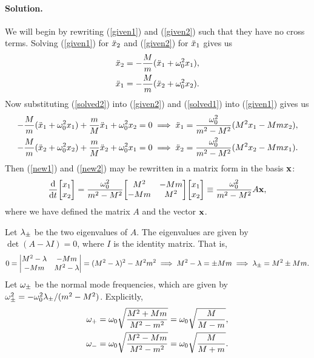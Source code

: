 \documentclass[11pt]{article}
\newcommand{\refeq}[1]{(\ref{#1})}
\newenvironment{solution}
{
    \paragraph{Solution.}
    \ignorespaces
}
{
    \bigskip
}
\begin{document}
\begin{solution}
	We will begin by rewriting \refeq{given1} and \refeq{given2} such that they have no cross terms.  Solving \refeq{given1} for $\ddot{x}_2$ and \refeq{given2} for $\ddot{x}_1$ gives us
	\begin{align}
		\ddot{x}_2 &= -\frac{M}{m} (\ddot{x}_1 + \omega_0^2 x_1), \label{solved2} \\
		\ddot{x}_1 &= -\frac{M}{m} (\ddot{x}_2 + \omega_0^2 x_2). \label{solved1}
	\end{align}
	Now substituting \refeq{solved2} into \refeq{given2} and \refeq{solved1} into \refeq{given1} gives us
	\begin{align}
		-\frac{M}{m} (\ddot{x}_1 + \omega_0^2 x_1) + \frac{m}{M} \ddot{x}_1 + \omega_0^2 x_2 = 0 &\implies \ddot{x}_1 = \frac{\omega_0^2}{m^2 - M^2} (M^2 x_1 - M m x_2), \label{new1} \\
		-\frac{M}{m} (\ddot{x}_2 + \omega_0^2 x_2) + \frac{m}{M} \ddot{x}_2 + \omega_0^2 x_1 = 0 &\implies \ddot{x}_2 = \frac{\omega_0^2}{m^2 - M^2} (M^2 x_2 - M m x_1). \label{new2}
	\end{align}
	Then \refeq{new1} and \refeq{new2} may be rewritten in a matrix form in the basis $\mathbf{x}$:
	\begin{align}
		\dv{}{t} \mqty[ \xq \\ \xw ] = \frac{\omo^2}{m^2 - M^2} \mqty[ M^2 & -Mm \\ -Mm & M^2 ] \mqty[ \xq \\ \xw ] \equiv \frac{\omo^2}{m^2 - M^2} A \vx,
	\end{align}
	where we have defined the matrix $A$ and the vector $\mathbf{x}$.
	
	Let $\lambda_\pm$ be the two eigenvalues of $A$.  The eigenvalues are given by $\det(A - \lambda I) = 0$, where $I$ is the identity matrix.  That is,
	\begin{align}
		0 = \mdet{M^2 - \lambda & -Mm \\ -Mm & M^2 - \lambda} = (M^2 - \lambda)^2 - M^2 m^2 \implies M^2 - \lambda = \pm Mm \implies \lmpm = M^2 \pm Mm.
	\end{align}
	Let $\omega_\pm$ be the normal mode frequencies, which are given by $\omega_\pm^2 = -\omega_0^2 \lambda_\pm / (m^2 - M^2)$.  Explicitly,
	\begin{align}
		\omega_+ &= \omega_0 \sqrt{\frac{M^2 + Mm}{M^2 - m^2}} = \omega_0 \sqrt{\frac{M}{M - m}}, \\
		\omega_- &= \omega_0 \sqrt{\frac{M^2 - Mm}{M^2 - m^2}} = \omega_0 \sqrt{\frac{M}{M + m}}.
	\end{align}
\end{solution}

\newcommand{\mq}{m_1}
\newcommand{\mw}{m_2}
\newcommand{\elq}{\ell_1}
\newcommand{\elw}{\ell_2}
\end{document}
